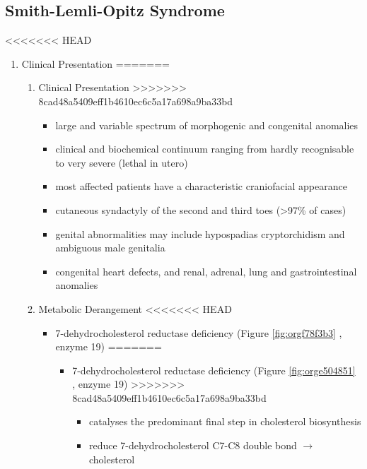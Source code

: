 \documentclass{scrartcl}
\begin{document}
\begin{itemize}
\begin{enumerate}
\begin{enumerate}
\end{enumerate}

\subsection{Smith-Lemli-Opitz Syndrome}
<<<<<<< HEAD
\label{sec:org022fef0}
\begin{enumerate}
\item Clinical Presentation
\label{sec:org81bd690}
=======
\label{sec:org71ab4ac}
\begin{enumerate}
\item Clinical Presentation
\label{sec:org6ddfe2d}
>>>>>>> 8cad48a5409eff1b4610ec6c5a17a698a9ba33bd
\begin{itemize}
\item large and variable spectrum of morphogenic and congenital anomalies
\item clinical and biochemical continuum ranging from hardly recognisable
to very severe (lethal in utero)
\item most affected patients have a characteristic craniofacial appearance
\item cutaneous syndactyly of the second and third toes (>97\% of cases)
\item genital abnormalities may include hypospadias cryptorchidism and
ambiguous male genitalia
\item congenital heart defects, and renal, adrenal, lung and
gastrointestinal anomalies
\end{itemize}

\item Metabolic Derangement
<<<<<<< HEAD
\label{sec:org2f1b4ba}
\begin{itemize}
\item 7-dehydrocholesterol reductase deficiency (Figure \ref{fig:orgf78f3b3} , enzyme 19)
=======
\label{sec:orge49af18}
\begin{itemize}
\item 7-dehydrocholesterol reductase deficiency (Figure \ref{fig:orge504851} , enzyme 19)
>>>>>>> 8cad48a5409eff1b4610ec6c5a17a698a9ba33bd
\begin{itemize}
\item catalyses the predominant final step in cholesterol biosynthesis
\item reduce 7-dehydrocholesterol C7-C8 double bond \(\to\) cholesterol
\end{itemize}
\end{itemize}


\end{itemize}
\end{enumerate}
\end{enumerate}
\end{enumerate}
\end{itemize}
\end{document}
